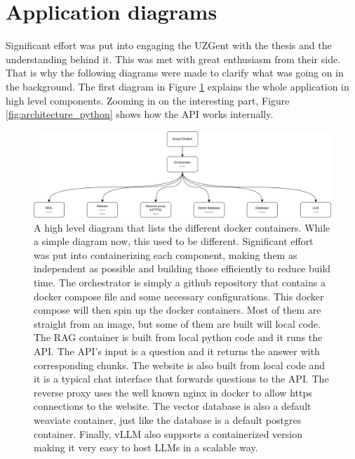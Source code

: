 \section{Application diagrams}
Significant effort was put into engaging the UZGent with the thesis and the understanding behind it. This was met with great enthusiasm from their side. That is why the following diagrams were made to clarify what was going on in the background. The first diagram in Figure \ref{fig:architecture_docker} explains the whole application in high level components. Zooming in on the interesting part, Figure \ref{fig:architecture_python} shows how the API works internally.

\begin{figure}[H]
    \captionsetup{justification=centering}
    \centerline{\includegraphics[width=1\linewidth]{fig/Architecture Docker.png}}
    \caption{A high level diagram that lists the different docker containers. While a simple diagram now, this used to be different. Significant effort was put into containerizing each component, making them as independent as possible and building those efficiently to reduce build time. The orchestrator is simply a github repository that contains a docker compose file and some necessary configurations. This docker compose will then spin up the docker containers. Most of them are straight from an image, but some of them are built will local code. The RAG container is built from local python code and it runs the API. The API's input is a question and it returns the answer with corresponding chunks. The website is also built from local code and it is a typical chat interface that forwards questions to the API. The reverse proxy uses the well known nginx in docker to allow https connections to the website. The vector database is also a default weaviate container, just like the database is a default postgres container. Finally, vLLM also supports a containerized version making it very easy to host LLMs in a scalable way.}
    \label{fig:architecture_docker}
\end{figure}

